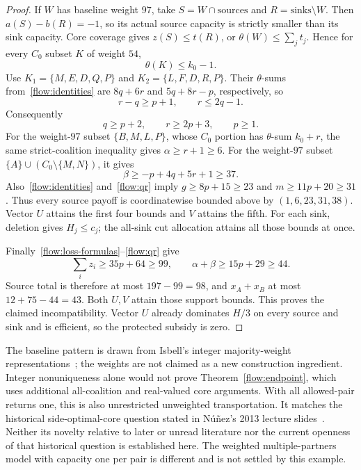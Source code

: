 \documentclass[11pt]{article}
\theoremstyle{remark}
\begin{document}
\begin{proof}
If $W$ has baseline weight $97$, take $S=W\cap\mathrm{sources}$
and $R=\mathrm{sinks}\setminus W$. Then $a(S)-b(R)=-1$, so its
actual source capacity is strictly smaller than its sink capacity.
Core coverage gives $z(S)\le t(R)$, or
$\theta(W)\le\sum_jt_j$. Hence for every $C_0$ subset $K$ of
weight $54$,
\[
                         \theta(K)\le k_0-1.
\]
Use $K_1=\{M,E,D,Q,P\}$ and $K_2=\{L,F,D,R,P\}$.
Their $\theta$-sums from~\eqref{flow:identities} are $8q+6r$ and
$5q+8r-p$, respectively, so
\[
              r-q\ge p+1,\qquad r\le2q-1.
\]
Consequently
\begin{equation}\label{flow:qr}
                     q\ge p+2,\qquad r\ge2p+3,\qquad p\ge1.
\end{equation}
For the weight-$97$ subset $\{B,M,L,P\}$, whose $C_0$ portion has
$\theta$-sum $k_0+r$, the same strict-coalition inequality gives
$\alpha\ge r+1\ge6$. For the weight-$97$ subset
$\{A\}\cup(C_0\setminus\{M,N\})$, it gives
\[
                    \beta\ge -p+4q+5r+1\ge37.
\]
Also~\eqref{flow:identities} and~\eqref{flow:qr} imply
$g\ge8p+15\ge23$ and $m\ge11p+20\ge31$.
Thus every source payoff is coordinatewise bounded above by
$(1,6,23,31,38)$. Vector $U$ attains the first four bounds and $V$
attains the fifth. For each sink, deletion gives $H_j\le c_j$;
the all-sink cut allocation attains all those bounds at once.

Finally~\eqref{flow:loss-formulas}--\eqref{flow:qr} give
\[
             \sum_i z_i\ge35p+64\ge99,
              \qquad \alpha+\beta\ge15p+29\ge44.
\]
Source total is therefore at most $197-99=98$, and $x_A+x_B$ at
most $12+75-44=43$. Both $U,V$ attain those support bounds. This
proves the claimed incompatibility. Vector $U$ already dominates
$H/3$ on every source and sink and is efficient, so the protected
subsidy is zero.
\end{proof}

The baseline pattern is drawn from Isbell's integer majority-weight
representations~\cite[p.~27]{flow:Isbell1959}; the weights are not
claimed as a new construction ingredient. Integer nonuniqueness alone
would not prove Theorem~\ref{flow:endpoint}, which uses additional
all-coalition and real-valued core arguments. With all allowed-pair
returns one, this is also unrestricted unweighted transportation.
It matches the historical side-optimal-core question stated in
N\'u\~nez's 2013 lecture slides~\cite[pp.~37--40]{flow:Nunez2013}.
Neither its novelty relative to later or unread literature nor the
current openness of that historical question is established here.
The weighted multiple-partners model with capacity one per pair is
different and is not settled by this example.
\end{document}
